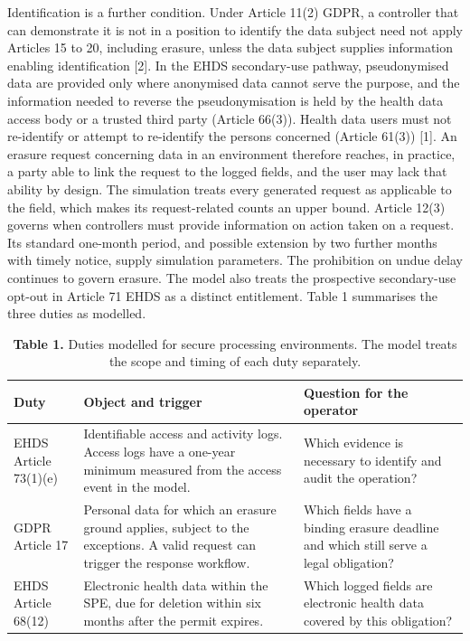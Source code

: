 \documentclass[5p,twocolumn]{elsarticle}
\begin{document}
Identification is a further condition. Under Article 11(2) GDPR, a
controller that can demonstrate it is not in a position to identify the
data subject need not apply Articles 15 to 20, including erasure, unless
the data subject supplies information enabling identification {[}2{]}.
In the EHDS secondary-use pathway, pseudonymised data are provided only
where anonymised data cannot serve the purpose, and the information
needed to reverse the pseudonymisation is held by the health data access
body or a trusted third party (Article 66(3)). Health data users must
not re-identify or attempt to re-identify the persons concerned (Article
61(3)) {[}1{]}. An erasure request concerning data in an environment
therefore reaches, in practice, a party able to link the request to the
logged fields, and the user may lack that ability by design. The
simulation treats every generated request as applicable to the field,
which makes its request-related counts an upper bound. Article 12(3)
governs when controllers must provide information on action taken on a
request. Its standard one-month period, and possible extension by two
further months with timely notice, supply simulation parameters. The
prohibition on undue delay continues to govern erasure. The model also
treats the prospective secondary-use opt-out in Article 71 EHDS as a
distinct entitlement. Table 1 summarises the three duties as modelled.

\begin{table}[!tbp]
\captionsetup{justification=raggedright,singlelinecheck=false}
\caption*{\textbf{Table 1.} Duties modelled for secure processing environments.
The model treats the scope and timing of each duty separately.}
\small
\begin{tabularx}{\textwidth}{>{\raggedright\arraybackslash}X>{\raggedright\arraybackslash}X>{\raggedright\arraybackslash}X}
\toprule
\textbf{Duty} & \textbf{Object and trigger} & \textbf{Question for the operator} \\
\midrule
EHDS Article 73(1)(e) & Identifiable access and activity logs. Access logs have a one-year minimum measured from the access event in the model. & Which evidence is necessary to identify and audit the operation? \\
GDPR Article 17 & Personal data for which an erasure ground applies, subject to the exceptions. A valid request can trigger the response workflow. & Which fields have a binding erasure deadline and which still serve a legal obligation? \\
EHDS Article 68(12) & Electronic health data within the SPE, due for deletion within six months after the permit expires. & Which logged fields are electronic health data covered by this obligation? \\
\bottomrule
\end{tabularx}
\end{table}
\end{document}
